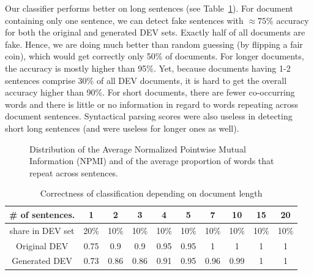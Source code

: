 \documentclass[11pt]{article}
\begin{document}
Our classifier performs better on long sentences (see Table~\ref{TableCorr}).
For document containing only one sentence, we can detect fake sentences with $\approx 75\%$ accuracy
for both the original and generated DEV sets.
Exactly half of all documents are fake. Hence, we are doing much
better than random guessing (by flipping a fair coin), which would get correctly only 50\% of documents.
For longer documents, the accuracy is mostly higher than 95\%.
Yet, because documents having 1-2 sentences comprise 30\% of all DEV documents,
it is hard to get the overall accuracy higher than 90\%.
For short documents, 
there are fewer co-occurring words and there is little or no information in regard to words repeating
across document sentences. 
Syntactical parsing scores were also useless in detecting short long sentences (and were useless
for longer ones as well).


\begin{figure}[ht]
\centering
\caption{Distribution of the Average Normalized Pointwise Mutual Information (NPMI) and 
of the average proportion of words that repeat across sentences.\label{FigNPMI}}
\end{figure}


\begin{table}\centering
\caption{Correctness of classification depending on document length\label{TableCorr}}
\begin{tabular}{c|c|c|c|c|c|c|c|c|c}
\# of sentences.  &  1   &  2   &   3   &  4   &   5   &    7  & 10   & 15   &  20  \\\hline
share in DEV set  & 20\% & 10\% &  10\% & 10\% &  10\% &  10\% & 10\% & 10\% & 10\%  \\\hline\hline
Original DEV      & 0.75 & 0.9  &  0.9  & 0.95 & 0.95  &    1  &   1  &   1  &  1 \\\hline
Generated DEV     & 0.73 & 0.86 &  0.86 & 0.91 & 0.95  &   0.96&  0.99 &  1  &  1 \\\hline
\end{tabular}
\end{table}
\end{document}
